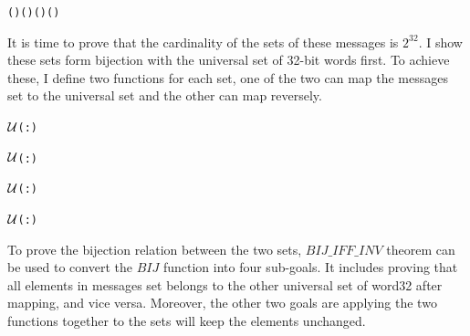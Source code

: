 \documentclass{article}
\begin{document}
\begin{alltt}
   \HOLTokenTurnstile{}    \HOLSymConst{\HOLTokenConj{}}  \HOLSymConst{\HOLTokenLeq{}}  \HOLSymConst{\HOLTokenImp{}}
     (  ) ( ) \HOLSymConst{=}   (  ) ( )
\end{alltt}

It is time to prove that the cardinality of the sets of these messages is $2^{32}$. I show these sets form bijection with
the universal set of 32-bit words first. To achieve these, I define two functions for each set, one of the two can map the messages
set to the universal set and the other can map reversely.

\begin{alltt}
   \HOLTokenTurnstile{}    \ensuremath{{\cal{U}}}(:)
\end{alltt}

\begin{alltt}
   \HOLTokenTurnstile{}    \ensuremath{{\cal{U}}}(:)
\end{alltt}

\begin{alltt}
   \HOLTokenTurnstile{}    \ensuremath{{\cal{U}}}(:)
\end{alltt}

\begin{alltt}
   \HOLTokenTurnstile{}    \ensuremath{{\cal{U}}}(:)
\end{alltt}

To prove the bijection relation between the two sets, $BIJ\_IFF\_INV$ theorem can be used to convert the $BIJ$ function into
four sub-goals. It includes proving that all elements in messages set belongs to the other universal set of word32 after mapping,
and vice versa. Moreover, the other two goals are applying the two functions together to the sets will keep the elements unchanged.
\end{document}
